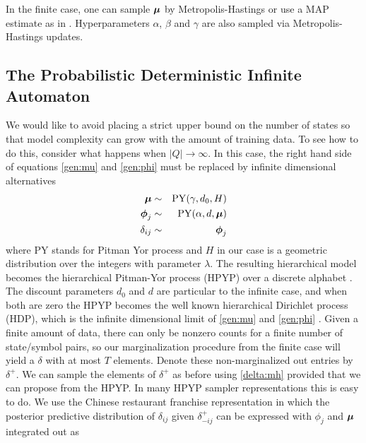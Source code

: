In the finite case, one can sample $\bmu$ by Metropolis-Hastings or use a MAP estimate as in \cite{Mackay1995}.  Hyperparameters $\alpha$, $\beta$ and $\gamma$ are also sampled via Metropolis-Hastings updates.
 
 \subsection{The Probabilistic Deterministic Infinite Automaton}
 
We would like to avoid placing a strict upper bound on the number of states so that model complexity can grow with the amount of training data.  To see how to do this, consider what happens when $|Q|\rightarrow\infty$.   In this case, the right hand side of equations \eqref{gen:mu} and \eqref{gen:phi} must be replaced by infinite dimensional alternatives
%
\begin{eqnarray*}
\bmu &\sim& \mathrm{PY}(\gamma,d_0,H)\\
\bphi_j &\sim& \mathrm{PY}(\alpha, d, \bmu) \\
\delta_{ij} &\sim& \bphi_j
\end{eqnarray*}
%  
where $\mathrm{PY}$ stands for Pitman Yor process and $H$ in our case is a geometric distribution over the integers with parameter $\lambda$.   The resulting hierarchical model becomes the hierarchical Pitman-Yor process (HPYP) over a discrete alphabet \cite{Teh2006a}.  The discount parameters $d_0$ and $d$ are particular to the infinite case, and when both are zero the HPYP becomes the well known hierarchical Dirichlet process (HDP), which is the infinite dimensional limit of \eqref{gen:mu} and \eqref{gen:phi} \cite{Teh2006b}.
Given a finite amount of data, there can only be nonzero counts for a finite number of state/symbol pairs, so our marginalization procedure from the finite case will yield a $\delta$ with at most $T$ elements.  Denote these non-marginalized out entries by $\delta^+$.  We can sample the elements of $\delta^+$ as before using \eqref{delta:mh} provided that we can propose from the HPYP.  In many HPYP sampler representations this is easy to do.  We use the Chinese restaurant franchise representation \cite{Teh2006b} in which the posterior predictive distribution of $\delta_{ij}$ given $\delta_{-ij}^+$ can be expressed with $\phi_j$ and $\bmu$ integrated out as
